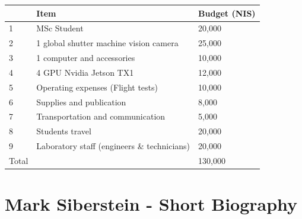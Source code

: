 \documentclass{article} %
\begin{document}
\begin{center}
	\begin{tabular}{ | l | l | l | }
		\hline
				& Item 											& Budget (NIS) 	\\ \hline
		1		& MSc Student 									& 20,000    	\\ \hline
		2		& 1 global shutter machine vision camera 		& 25,000 		\\ \hline
		3 		& 1 computer and accessories 					& 10,000 		\\ \hline
		4 		& 4 GPU Nvidia Jetson TX1	 					& 12,000 		\\ \hline
		5 		& Operating expenses (Flight tests) 			& 10,000 		\\ \hline
		6 		& Supplies and publication	 					& 8,000 		\\ \hline
		7 		& Transportation and communication				& 5,000 		\\ \hline
		8 		& Students travel 								& 20,000 		\\ \hline
		9 		& Laboratory staff (engineers \& technicians)	& 20,000 		\\ \hline
		Total 	&  							 					& 130,000 		\\ \hline
	\end{tabular}
\end{center}

\section{Mark Siberstein - Short Biography}



\end{document}
